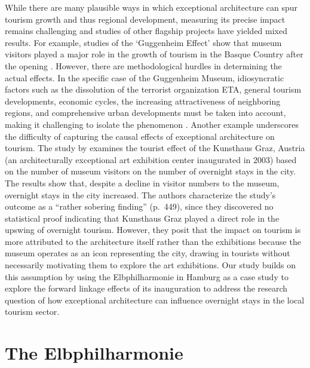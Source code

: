 \documentclass[a4paper, 12pt]{article}
\begin{document}
While there are many plausible ways in which exceptional architecture can spur tourism growth and thus regional development, measuring its precise impact remains challenging and studies of other flagship projects have yielded mixed results. For example, studies of the `Guggenheim Effect' show that museum visitors played a major role in the growth of tourism in the Basque Country after the opening \citep{plaza2000}. However, there are methodological hurdles in determining the actual effects. In the specific case of the Guggenheim Museum, idiosyncratic factors such as the dissolution of the terrorist organization ETA, general tourism developments, economic cycles, the increasing attractiveness of neighboring regions, and comprehensive urban developments must be taken into account, making it challenging to isolate the phenomenon \citep{plaza2000, voltes-dorta2016}. Another example underscores the difficulty of capturing the causal effects of exceptional architecture on tourism. The study by \citet{dreher2020} examines the tourist effect of the Kunsthaus Graz, Austria (an architecturally exceptional art exhibition center inaugurated in 2003) based on the number of museum visitors on the number of overnight stays in the city. The results show that, despite a decline in visitor numbers to the museum, overnight stays in the city increased. The authors characterize the study's outcome as a ``rather sobering finding'' (p.~449), since they discovered no statistical proof indicating that Kunsthaus Graz played a direct role in the upswing of overnight tourism. However, they posit that the impact on tourism is more attributed to the architecture itself rather than the exhibitions because the museum operates as an icon representing the city, drawing in tourists without necessarily motivating them to explore the art exhibitions. Our study builds on this assumption by using the Elbphilharmonie in Hamburg as a case study to explore the forward linkage effects \citep{gelman2013a, hiller1998} of its inauguration to address the research question of how exceptional architecture can influence overnight stays in the local tourism sector.


\section{The Elbphilharmonie}
\end{document}
